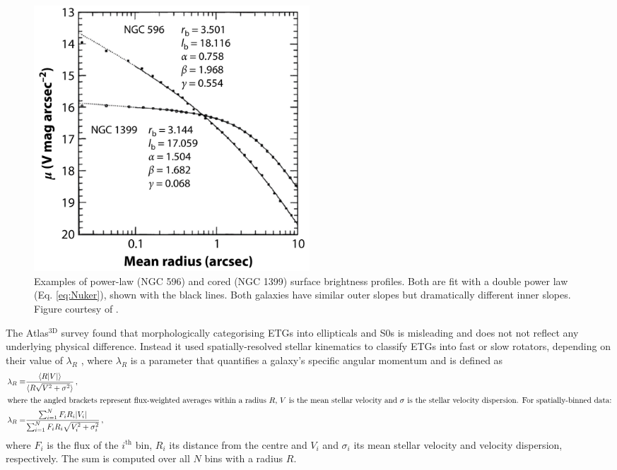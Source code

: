	\begin{figure}
		\centering
		\includegraphics[width=0.5\textwidth]{introduction/exampleCorePower.jpeg}
		\caption[Example of cored and power-law surface brightness profile]{Examples of power-law (NGC 596) and cored (NGC 1399) surface brightness profiles. Both are fit with a double power law (Eq. \ref{eq:Nuker}), shown with the black lines. Both galaxies have similar outer slopes but dramatically different inner slopes. Figure courtesy of \citet{Lauer1995}.}
		\label{fig:CorePower}
	\end{figure}

	The Atlas$^\text{3D}$ survey \citep{Cappellari2011} found that morphologically categorising ETGs into ellipticals and S0s is misleading and does not not reflect any underlying physical difference. Instead it used spatially-resolved stellar kinematics to classify ETGs into fast or slow rotators, depending on their value of $\lambda_R$ \citep{Emsellem2011}, where $\lambda_R$ is a parameter that quantifies a galaxy's specific angular momentum and is defined as
	\begin{align}
		\lambda_R \equiv & \frac{\langle R |V|\rangle}{\langle R \sqrt{V^2 + \sigma^2}\rangle} \, ,\\
		\intertext{where the angled brackets represent flux-weighted averages within a radius $R$, $V$ is the mean stellar velocity and $\sigma$ is the stellar velocity dispersion. For spatially-binned data:}
		\lambda_R = & \frac{\sum_{i=1}^{N} F_i R_i |V_i|}{\sum_{i=1}^{N} F_i R_i \sqrt{V_i^2 + \sigma_i^2}} \, ,
	\end{align}
	where $F_i$ is the flux of the $i^\text{th}$ bin, $R_i$ its distance from the centre and $V_i$ and $\sigma_i$ its mean stellar velocity and velocity dispersion, respectively. The sum is computed over all $N$ bins with a radius $R$. 

